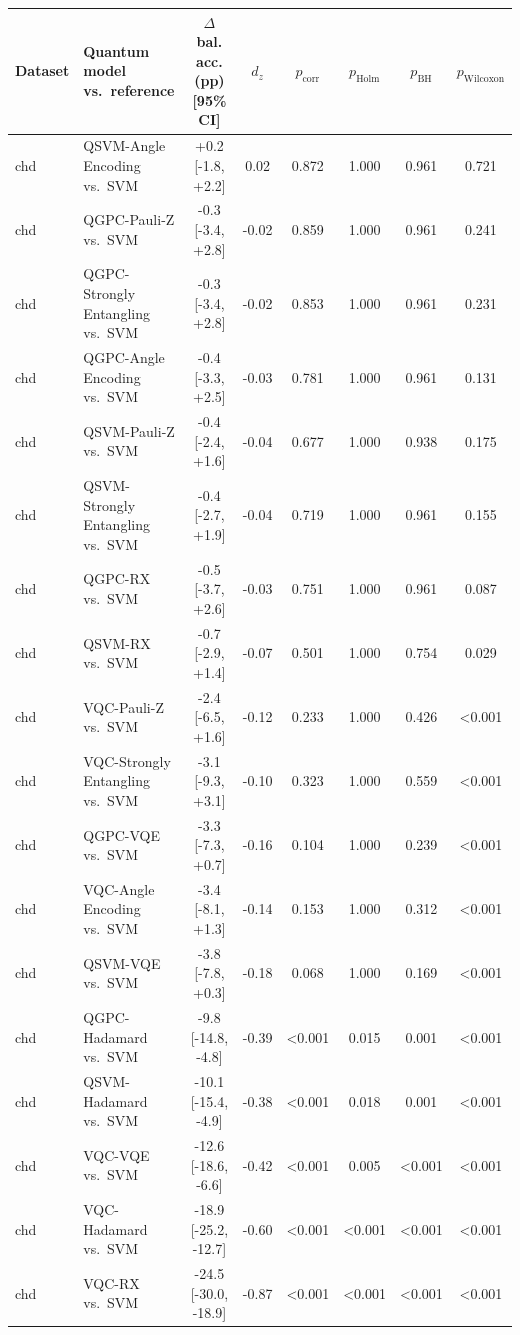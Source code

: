 \begin{tabular}{llcccccc}
\toprule
Dataset & Quantum model vs.\ reference & $\Delta$ bal. acc. (pp) [95\% CI] & $d_z$ & $p_{\mathrm{corr}}$ & $p_{\mathrm{Holm}}$ & $p_{\mathrm{BH}}$ & $p_{\mathrm{Wilcoxon}}$ \\
\midrule
chd & QSVM-Angle Encoding vs.\ SVM & +0.2 [-1.8, +2.2] & 0.02 & 0.872 & 1.000 & 0.961 & 0.721 \\
chd & QGPC-Pauli-Z vs.\ SVM & -0.3 [-3.4, +2.8] & -0.02 & 0.859 & 1.000 & 0.961 & 0.241 \\
chd & QGPC-Strongly Entangling vs.\ SVM & -0.3 [-3.4, +2.8] & -0.02 & 0.853 & 1.000 & 0.961 & 0.231 \\
chd & QGPC-Angle Encoding vs.\ SVM & -0.4 [-3.3, +2.5] & -0.03 & 0.781 & 1.000 & 0.961 & 0.131 \\
chd & QSVM-Pauli-Z vs.\ SVM & -0.4 [-2.4, +1.6] & -0.04 & 0.677 & 1.000 & 0.938 & 0.175 \\
chd & QSVM-Strongly Entangling vs.\ SVM & -0.4 [-2.7, +1.9] & -0.04 & 0.719 & 1.000 & 0.961 & 0.155 \\
chd & QGPC-RX vs.\ SVM & -0.5 [-3.7, +2.6] & -0.03 & 0.751 & 1.000 & 0.961 & 0.087 \\
chd & QSVM-RX vs.\ SVM & -0.7 [-2.9, +1.4] & -0.07 & 0.501 & 1.000 & 0.754 & 0.029 \\
chd & VQC-Pauli-Z vs.\ SVM & -2.4 [-6.5, +1.6] & -0.12 & 0.233 & 1.000 & 0.426 & <0.001 \\
chd & VQC-Strongly Entangling vs.\ SVM & -3.1 [-9.3, +3.1] & -0.10 & 0.323 & 1.000 & 0.559 & <0.001 \\
chd & QGPC-VQE vs.\ SVM & -3.3 [-7.3, +0.7] & -0.16 & 0.104 & 1.000 & 0.239 & <0.001 \\
chd & VQC-Angle Encoding vs.\ SVM & -3.4 [-8.1, +1.3] & -0.14 & 0.153 & 1.000 & 0.312 & <0.001 \\
chd & QSVM-VQE vs.\ SVM & -3.8 [-7.8, +0.3] & -0.18 & 0.068 & 1.000 & 0.169 & <0.001 \\
chd & QGPC-Hadamard vs.\ SVM & -9.8 [-14.8, -4.8] & -0.39 & <0.001 & 0.015 & 0.001 & <0.001 \\
chd & QSVM-Hadamard vs.\ SVM & -10.1 [-15.4, -4.9] & -0.38 & <0.001 & 0.018 & 0.001 & <0.001 \\
chd & VQC-VQE vs.\ SVM & -12.6 [-18.6, -6.6] & -0.42 & <0.001 & 0.005 & <0.001 & <0.001 \\
chd & VQC-Hadamard vs.\ SVM & -18.9 [-25.2, -12.7] & -0.60 & <0.001 & <0.001 & <0.001 & <0.001 \\
chd & VQC-RX vs.\ SVM & -24.5 [-30.0, -18.9] & -0.87 & <0.001 & <0.001 & <0.001 & <0.001 \\

\end{tabular}
